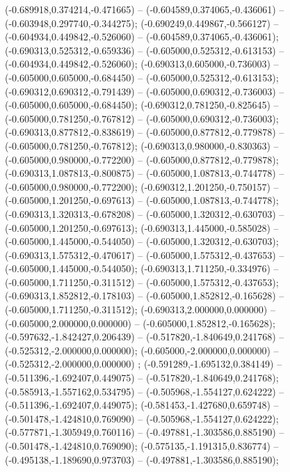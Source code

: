  (-0.689918,0.374214,-0.471665) -- (-0.604589,0.374065,-0.436061) -- (-0.603948,0.297740,-0.344275);
 (-0.690249,0.449867,-0.566127) -- (-0.604934,0.449842,-0.526060) -- (-0.604589,0.374065,-0.436061);
 (-0.690313,0.525312,-0.659336) -- (-0.605000,0.525312,-0.613153) -- (-0.604934,0.449842,-0.526060);
 (-0.690313,0.605000,-0.736003) -- (-0.605000,0.605000,-0.684450) -- (-0.605000,0.525312,-0.613153);
 (-0.690312,0.690312,-0.791439) -- (-0.605000,0.690312,-0.736003) -- (-0.605000,0.605000,-0.684450);
 (-0.690312,0.781250,-0.825645) -- (-0.605000,0.781250,-0.767812) -- (-0.605000,0.690312,-0.736003);
 (-0.690313,0.877812,-0.838619) -- (-0.605000,0.877812,-0.779878) -- (-0.605000,0.781250,-0.767812);
 (-0.690313,0.980000,-0.830363) -- (-0.605000,0.980000,-0.772200) -- (-0.605000,0.877812,-0.779878);
 (-0.690313,1.087813,-0.800875) -- (-0.605000,1.087813,-0.744778) -- (-0.605000,0.980000,-0.772200);
 (-0.690312,1.201250,-0.750157) -- (-0.605000,1.201250,-0.697613) -- (-0.605000,1.087813,-0.744778);
 (-0.690313,1.320313,-0.678208) -- (-0.605000,1.320312,-0.630703) -- (-0.605000,1.201250,-0.697613);
 (-0.690313,1.445000,-0.585028) -- (-0.605000,1.445000,-0.544050) -- (-0.605000,1.320312,-0.630703);
 (-0.690313,1.575312,-0.470617) -- (-0.605000,1.575312,-0.437653) -- (-0.605000,1.445000,-0.544050);
 (-0.690313,1.711250,-0.334976) -- (-0.605000,1.711250,-0.311512) -- (-0.605000,1.575312,-0.437653);
 (-0.690313,1.852812,-0.178103) -- (-0.605000,1.852812,-0.165628) -- (-0.605000,1.711250,-0.311512);
 (-0.690313,2.000000,0.000000) -- (-0.605000,2.000000,0.000000) -- (-0.605000,1.852812,-0.165628);
 (-0.597632,-1.842427,0.206439) -- (-0.517820,-1.840649,0.241768) -- (-0.525312,-2.000000,0.000000);
 (-0.605000,-2.000000,0.000000) -- (-0.525312,-2.000000,0.000000) ;
 (-0.591289,-1.695132,0.384149) -- (-0.511396,-1.692407,0.449075) -- (-0.517820,-1.840649,0.241768);
 (-0.585913,-1.557162,0.534795) -- (-0.505968,-1.554127,0.624222) -- (-0.511396,-1.692407,0.449075);
 (-0.581453,-1.427680,0.659748) -- (-0.501478,-1.424810,0.769090) -- (-0.505968,-1.554127,0.624222);
 (-0.577871,-1.305949,0.760116) -- (-0.497881,-1.303586,0.885190) -- (-0.501478,-1.424810,0.769090);
 (-0.575135,-1.191315,0.836774) -- (-0.495138,-1.189690,0.973703) -- (-0.497881,-1.303586,0.885190);
